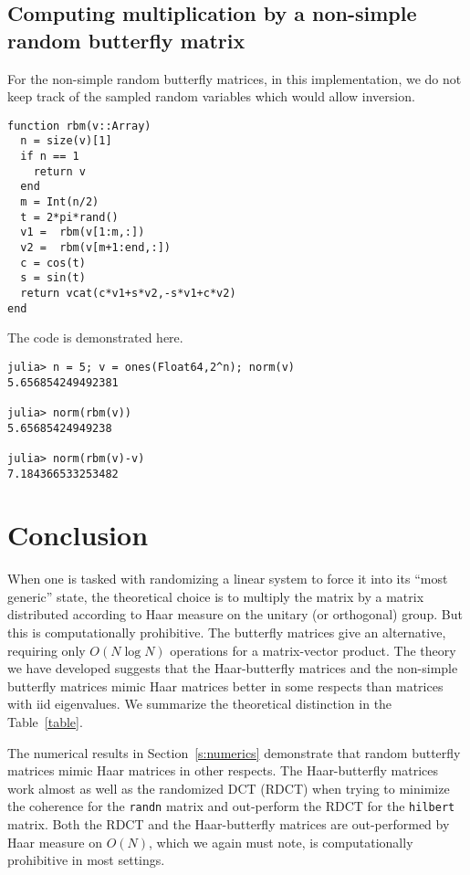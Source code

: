 \documentclass{amsart}
\theoremstyle{definition}
\theoremstyle{remark}
\numberwithin{equation}{section}
\begin{document}
\subsection{Computing multiplication by a non-simple random butterfly matrix}\label{s:code_rbm}

For the non-simple random butterfly matrices, in this implementation, we do not keep track of the sampled random variables which would allow inversion.

\begin{lstlisting}[linewidth = \linewidth,frame = trBL]
function rbm(v::Array)
  n = size(v)[1]
  if n == 1
    return v
  end
  m = Int(n/2)
  t = 2*pi*rand()
  v1 =  rbm(v[1:m,:])
  v2 =  rbm(v[m+1:end,:])
  c = cos(t)
  s = sin(t)
  return vcat(c*v1+s*v2,-s*v1+c*v2)
end
\end{lstlisting}
The code is demonstrated here.

\begin{lstlisting}[linewidth = \linewidth,frame = trBL]
julia> n = 5; v = ones(Float64,2^n); norm(v)
5.656854249492381

julia> norm(rbm(v))
5.65685424949238

julia> norm(rbm(v)-v)
7.184366533253482
\end{lstlisting}

\section{Conclusion}

When one is tasked with randomizing a linear system to force it into its ``most generic'' state, the theoretical choice is to multiply the matrix by a matrix distributed according to Haar measure on the unitary (or orthogonal) group.  But this is computationally prohibitive.  The butterfly matrices give an alternative, requiring only $O(N \log N)$ operations for a matrix-vector product.  The theory we have developed suggests that the Haar-butterfly matrices and the non-simple butterfly matrices mimic Haar matrices better in some respects than matrices with iid eigenvalues.  We summarize the theoretical distinction in the Table~\ref{table}.

The numerical results in Section~\ref{s:numerics} demonstrate that random butterfly matrices mimic Haar matrices in other respects.  The Haar-butterfly matrices work almost as well as the randomized DCT (RDCT) when trying to minimize the coherence for the {\tt randn} matrix and out-perform the RDCT for the {\tt hilbert} matrix.  Both the RDCT and the Haar-butterfly matrices are out-performed by Haar measure on $O(N)$, which we again must note, is computationally prohibitive in most settings.
\end{document}
